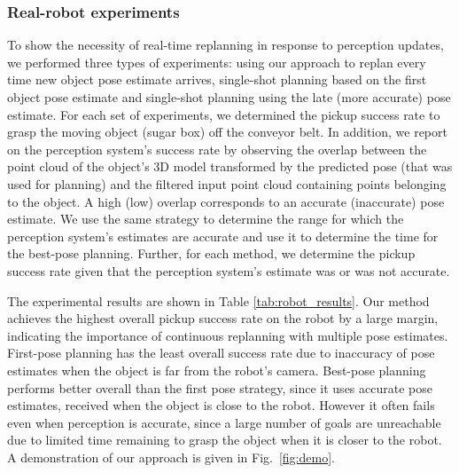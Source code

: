 \documentclass[a4paper]{report}
\begin{document}
\subsubsection{Real-robot experiments}
\label{sec:robot_results}
To show the necessity of real-time replanning in response to perception updates, we performed three types of experiments: 
using our approach to replan every time new object pose estimate arrives, single-shot planning based on the first object pose estimate 
and single-shot planning using the late (more accurate) pose estimate. 
%
For each set of experiments, we determined the pickup success rate to grasp the moving object (sugar box) off the conveyor belt. In addition, we report on the perception system's success rate by observing the overlap between the point cloud of the object's 3D model transformed by the predicted pose (that was used for planning) and the filtered input point cloud containing points belonging to the object. 
A high (low) overlap corresponds to an accurate (inaccurate) pose estimate. 
%
We use the same strategy to determine the range for which the perception system's estimates are accurate and use it to determine the time for the best-pose planning. 
Further, for each method, we determine the pickup success rate given that the perception system's estimate was or was not accurate. 

The experimental results are shown in Table \ref{tab:robot_results}. Our method achieves the highest overall pickup success rate on the robot by a large margin, indicating the importance of continuous replanning with multiple pose estimates. 
First-pose planning has the least overall success rate due to inaccuracy of pose estimates when the object is far from the robot's camera. 
Best-pose planning performs better overall than the first pose strategy, since it uses accurate pose estimates, received when the object is close to the robot. However it often fails even when perception is accurate, since a large number of goals are unreachable due to limited time remaining to grasp the object when it is closer to the robot.
A demonstration of our approach is given in Fig.~\ref{fig:demo}.
\end{document}
